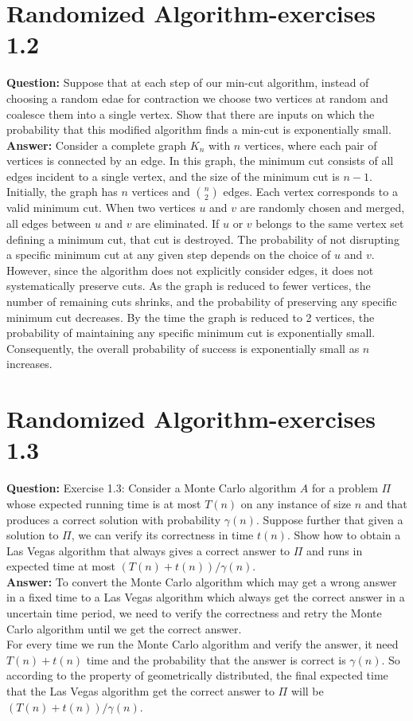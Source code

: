 \documentclass[12pt]{article}
\begin{document}
\section{Randomized Algorithm-exercises 1.2}
\textbf{Question:}
Suppose that at each step of our min-cut algorithm, instead of choosing a random edae for contraction we choose two vertices at random and coalesce them into a single vertex. Show that there are inputs on which the probability that this modified algorithm finds a min-cut is exponentially small.\\
\textbf{Answer:}
Consider a complete graph \( K_n \) with \( n \) vertices, where each pair of vertices is connected by an edge. In this graph, the minimum cut consists of all edges incident to a single vertex, and the size of the minimum cut is \( n-1 \). Initially, the graph has \( n \) vertices and \( \binom{n}{2} \) edges. Each vertex corresponds to a valid minimum cut. When two vertices \( u \) and \( v \) are randomly chosen and merged, all edges between \( u \) and \( v \) are eliminated. If \( u \) or \( v \) belongs to the same vertex set defining a minimum cut, that cut is destroyed. The probability of not disrupting a specific minimum cut at any given step depends on the choice of \( u \) and \( v \). However, since the algorithm does not explicitly consider edges, it does not systematically preserve cuts. As the graph is reduced to fewer vertices, the number of remaining cuts shrinks, and the probability of preserving any specific minimum cut decreases. By the time the graph is reduced to 2 vertices, the probability of maintaining any specific minimum cut is exponentially small. Consequently, the overall probability of success is exponentially small as \( n \) increases.



\section{Randomized Algorithm-exercises 1.3}
\textbf{Question:}
Exercise 1.3: Consider a Monte Carlo algorithm $A$ for a problem $\Pi$ whose expected running time is at most $T(n)$ on any instance of size $n$ and that produces a correct solution with probability $\gamma(n)$. Suppose further that given a solution to $\Pi$, we can verify its correctness in time $t(n)$. Show how to obtain a Las Vegas algorithm that always gives a correct answer to $\Pi$ and runs in expected time at most $(T(n) + t(n))/\gamma(n)$.\\
\textbf{Answer:}
To convert the Monte Carlo algorithm which may get a wrong answer in a fixed time to a Las Vegas algorithm which always get the correct answer in a uncertain time period, we need to verify the correctness and retry the Monte Carlo algorithm until we get the correct answer.\\
For every time we run the Monte Carlo algorithm and verify the answer, it need $T(n) + t(n)$ time and the probability that the answer is correct is $\gamma(n)$. So according to the property of geometrically distributed, the final expected time that the Las Vegas algorithm get the correct answer to $\Pi$ will be $(T(n) + t(n))/\gamma(n)$.
\end{document}
